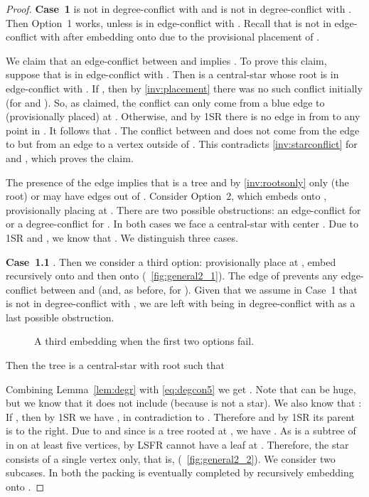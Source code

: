 \documentclass[11pt,a4paper,colorlinks=true,urlcolor=blue,citecolor=red]{article}
\theoremstyle{plain}
\newcommand{\case}[1]{\par\vspace{.5\baselineskip}\noindent\textbf{\sffamily Case~#1}}
\begin{document}
\begin{proof}
  \case{1}  is not in degree-conflict with  and
   is not in degree-conflict with . Then Option~1 works,
  unless  is in edge-conflict with . Recall that
   is not in edge-conflict with  after embedding 
  onto  due to the provisional placement of .


  We claim that an edge-conflict between  and  implies
  . To prove this claim, suppose that  is in
  edge-conflict with . Then  is a
  central-star whose root  is in edge-conflict with . If ,
  then by \ref{inv:placement} there was no such conflict initially (for
   and ). So, as claimed, the conflict can only come from a
  blue edge to  (provisionally placed) at . Otherwise,  and
  by 1SR there is no edge in  from  to any point in . It
  follows that . The conflict between
   and  does not come from the edge to  but from an edge to a
  vertex outside of . This contradicts \ref{inv:starconflict} for
   and , which proves the claim.

  The presence of the edge  implies that  is a tree and by
  \ref{inv:rootsonly} only (the root)  or  may have edges out of
  . Consider Option~2, which embeds  onto ,
  provisionally placing  at
  .  There are two possible
  obstructions: an edge-conflict for  or a degree-conflict for
  . In both cases we face a central-star  with
  center . Due to 1SR and , we know
  that . We distinguish three
  cases.

  \case{1.1} . Then we consider a third option:
  provisionally place  at , embed  recursively onto  and then  onto  (\figurename~\ref{fig:general2_1}). The edge
   of  prevents any edge-conflict between  and
   (and, as before, for ). Given that we assume in Case~1 that
   is not in degree-conflict with , we are left with
   being in degree-conflict with  as a last possible
  obstruction.
\begin{figure}[htbp]
    \centering\hfil {}\hfil
    \hfil
    \caption{A third embedding when the first two options
      fail.\label{fig:general2}}
  \end{figure}


\noindent
  Then the tree  is a central-star 
  with root  such that



  \noindent
  Combining Lemma~\ref{lem:degr} with \eqref{eq:degcon5} we get
. Note that  can be huge, but
  we know that it does not include  (because  is not a
  star). We also know that :
If , then by 1SR we have
, in contradiction to
  . Therefore 
  and by 1SR its parent is to the right. Due to  and
  since  is a tree rooted at , we have . As
   is a subtree of  in  on at least five vertices, by LSFR
   cannot have a leaf at . Therefore, the star
   consists of a single vertex only,
  that is,  (\figurename~\ref{fig:general2_2}). We consider
  two subcases.
In both the packing is eventually completed by recursively embedding  onto
  .


\end{proof}
\end{document}
